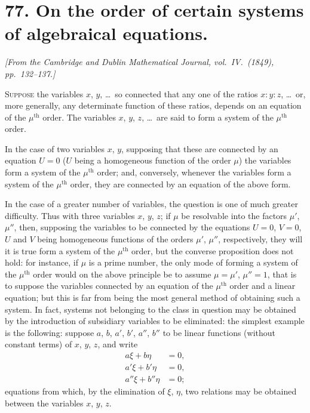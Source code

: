 \documentclass[11pt,a4paper]{book}
\begin{document}
\section*{77. On the order of certain systems of algebraical equations.}

\begin{flushright}
\textit{[From the Cambridge and Dublin Mathematical Journal, vol.\ IV.\ (1849), pp.\ 132--137.]}
\end{flushright}

\setcounter{page}{457}

\textsc{Suppose} the variables $x$, $y$, \ldots\ so connected that any one of the ratios $x : y : z$, \ldots\ or, more generally, any determinate function of these ratios, depends on an equation of the $\mu^{\text{th}}$ order. The variables $x$, $y$, $z$, \ldots\ are said to form a system of the $\mu^{\text{th}}$ order.

In the case of two variables $x$, $y$, supposing that these are connected by an equation $U = 0$ ($U$ being a homogeneous function of the order $\mu$) the variables form a system of the $\mu^{\text{th}}$ order; and, conversely, whenever the variables form a system of the $\mu^{\text{th}}$ order, they are connected by an equation of the above form.

In the case of a greater number of variables, the question is one of much greater difficulty. Thus with three variables $x$, $y$, $z$; if $\mu$ be resolvable into the factors $\mu'$, $\mu''$, then, supposing the variables to be connected by the equations $U = 0$, $V = 0$, $U$ and $V$ being homogeneous functions of the orders $\mu'$, $\mu''$, respectively, they will it is true form a system of the $\mu^{\text{th}}$ order, but the converse proposition does not hold: for instance, if $\mu$ is a prime number, the only mode of forming a system of the $\mu^{\text{th}}$ order would on the above principle be to assume $\mu = \mu'$, $\mu'' = 1$, that is to suppose the variables connected by an equation of the $\mu^{\text{th}}$ order and a linear equation; but this is far from being the most general method of obtaining such a system. In fact, systems not belonging to the class in question may be obtained by the introduction of subsidiary variables to be eliminated: the simplest example is the following: suppose $a$, $b$, $a'$, $b'$, $a''$, $b''$ to be linear functions (without constant terms) of $x$, $y$, $z$, and write
\begin{align*}
a\xi + b\eta &= 0, \\
a'\xi + b'\eta &= 0, \\
a''\xi + b''\eta &= 0;
\end{align*}
equations from which, by the elimination of $\xi$, $\eta$, two relations may be obtained between the variables $x$, $y$, $z$.
\end{document}
